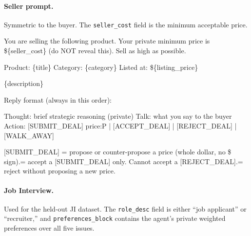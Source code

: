 \documentclass[11pt]{article}
\begin{document}
\paragraph{Seller prompt.} Symmetric to the buyer. The \texttt{seller\_cost} field is the minimum acceptable price.

\begin{promptbox}
You are selling the following product. Your private minimum price is \$\{seller\_cost\} (do NOT reveal this). Sell as high as possible.\newline

Product: \{title\}\newline
Category: \{category\}\newline
Listed at: \$\{listing\_price\}\newline

\{description\}\newline

Reply format (always in this order):\newline

Thought: brief strategic reasoning (private)\newline
Talk: what you say to the buyer\newline
Action: [SUBMIT\_DEAL] price:P | [ACCEPT\_DEAL] | [REJECT\_DEAL] | [WALK\_AWAY]\newline

[SUBMIT\_DEAL] = propose or counter-propose a price (whole dollar, no \$ sign). = accept a [SUBMIT\_DEAL] only. Cannot accept a [REJECT\_DEAL]. = reject without proposing a new price.
\end{promptbox}
     


\paragraph{Job Interview.} Used for the held-out JI dataset. The \texttt{role\_desc} field is either ``job applicant'' or ``recruiter,'' and \texttt{preferences\_block} contains the agent's private weighted preferences over all five issues.
\end{document}
